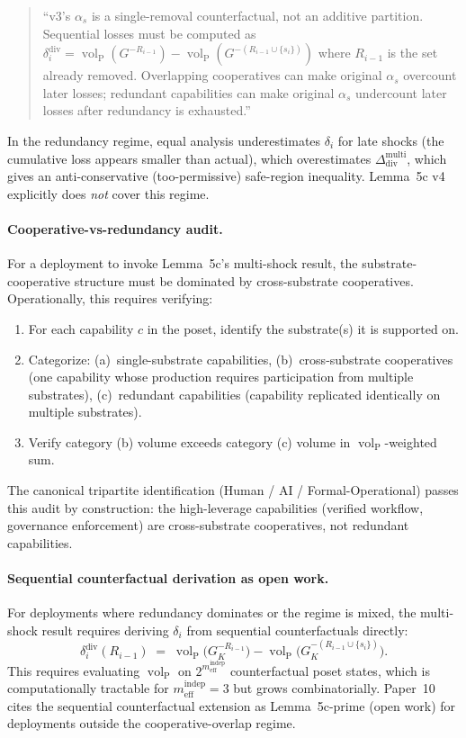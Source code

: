 \documentclass{article}
\DeclareMathOperator{\vol}{vol}
\newcommand{\volL}{{\vol_{\mathrm{P}}}}
\newcommand{\mindep}{m_{\mathrm{eff}}^{\mathrm{indep}}}
\newcommand{\Ddiv}{\Delta_{\mathrm{div}}}
\begin{document}
\begin{quote}
``v3's $\alpha_s$ is a single-removal counterfactual, not an additive
partition. Sequential losses must be computed as
$\delta_i^{\mathrm{div}} = \volL(G^{-R_{i-1}}) - \volL(G^{-(R_{i-1}
\cup \{s_i\})})$ where $R_{i-1}$ is the set already removed.
Overlapping cooperatives can make original $\alpha_s$ overcount later
losses; redundant capabilities can make original $\alpha_s$
undercount later losses after redundancy is exhausted.''
\end{quote}

In the redundancy regime, equal analysis underestimates $\delta_i$
for late shocks (the cumulative loss appears smaller than actual),
which overestimates $\Ddiv^{\mathrm{multi}}$, which gives an
anti-conservative (too-permissive) safe-region inequality.  Lemma~5c
v4 explicitly does \emph{not} cover this regime.

\paragraph{Cooperative-vs-redundancy audit.}
For a deployment to invoke Lemma~5c's multi-shock result, the
substrate-cooperative structure must be dominated by cross-substrate
cooperatives.  Operationally, this requires verifying:
\begin{enumerate}
\item For each capability $c$ in the poset, identify the substrate(s)
  it is supported on.
\item Categorize: (a)~single-substrate capabilities,
  (b)~cross-substrate cooperatives (one capability whose production
  requires participation from multiple substrates),
  (c)~redundant capabilities (capability replicated identically on
  multiple substrates).
\item Verify category (b) volume exceeds category (c) volume in
  $\volL$-weighted sum.
\end{enumerate}
The canonical tripartite identification (Human / AI /
Formal-Operational) passes this audit by construction: the
high-leverage capabilities (verified workflow, governance
enforcement) are cross-substrate cooperatives, not redundant
capabilities.

\paragraph{Sequential counterfactual derivation as open work.}
For deployments where redundancy dominates or the regime is mixed,
the multi-shock result requires deriving $\delta_i$ from sequential
counterfactuals directly:
\[
  \delta_i^{\mathrm{div}}(R_{i-1}) \;=\; \volL\bigl(G_K^{-R_{i-1}}\bigr)
  - \volL\bigl(G_K^{-(R_{i-1} \cup \{s_i\})}\bigr).
\]
This requires evaluating $\volL$ on $2^{\mindep}$ counterfactual
poset states, which is computationally tractable for $\mindep = 3$
but grows combinatorially.  Paper~10 cites the sequential
counterfactual extension as Lemma~5c-prime (open work) for
deployments outside the cooperative-overlap regime.
\end{document}
